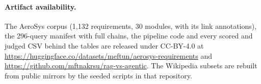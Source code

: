 \paragraph{Artifact availability.}
The AeroSys corpus (1{,}132 requirements, 30 modules, with its link
annotations), the 296-query manifest with full chains, the pipeline
code and every scored and judged CSV behind the tables are released
under CC-BY-4.0 at
\url{https://huggingface.co/datasets/meftun/aerosys-requirements}
and \url{https://github.com/mftnakrsu/rag-vs-agentic}. The Wikipedia subsets are
rebuilt from public mirrors by the seeded scripts in that repository.
